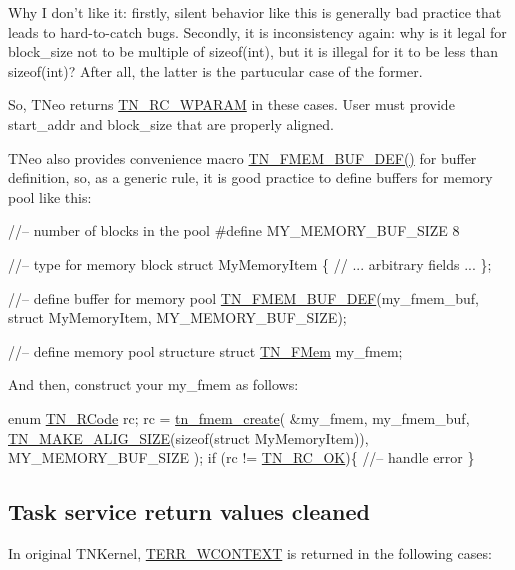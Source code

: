 Why I don't like it\+: firstly, silent behavior like this is generally bad practice that leads to hard-\/to-\/catch bugs. Secondly, it is inconsistency again\+: why is it legal for {\ttfamily block\+\_\+size} not to be multiple of {\ttfamily sizeof(int)}, but it is illegal for it to be less than {\ttfamily sizeof(int)}? After all, the latter is the partucular case of the former.

So, T\+Neo returns {\ttfamily \hyperlink{tn__common_8h_aa43bd3da1ad4c1e61224b5f23b369876a89909a6426b477a38496a1be67590e68}{T\+N\+\_\+\+R\+C\+\_\+\+W\+P\+A\+R\+A\+M}} in these cases. User must provide {\ttfamily start\+\_\+addr} and {\ttfamily block\+\_\+size} that are properly aligned.

T\+Neo also provides convenience macro {\ttfamily \hyperlink{tn__fmem_8h_ab45e9c2ad4a64345214f9a912bf76fc3}{T\+N\+\_\+\+F\+M\+E\+M\+\_\+\+B\+U\+F\+\_\+\+D\+E\+F()}} for buffer definition, so, as a generic rule, it is good practice to define buffers for memory pool like this\+:


\begin{DoxyCode}
\textcolor{comment}{//-- number of blocks in the pool}
\textcolor{preprocessor}{#define MY\_MEMORY\_BUF\_SIZE    8}

\textcolor{comment}{//-- type for memory block}
\textcolor{keyword}{struct }MyMemoryItem \{
   \textcolor{comment}{// ... arbitrary fields ...}
\};

\textcolor{comment}{//-- define buffer for memory pool}
\hyperlink{tn__fmem_8h_ab45e9c2ad4a64345214f9a912bf76fc3}{TN\_FMEM\_BUF\_DEF}(my\_fmem\_buf, \textcolor{keyword}{struct} MyMemoryItem, MY\_MEMORY\_BUF\_SIZE);

\textcolor{comment}{//-- define memory pool structure}
\textcolor{keyword}{struct }\hyperlink{structTN__FMem}{TN\_FMem} my\_fmem;
\end{DoxyCode}


And then, construct your {\ttfamily my\+\_\+fmem} as follows\+:


\begin{DoxyCode}
\textcolor{keyword}{enum} \hyperlink{tn__common_8h_aa43bd3da1ad4c1e61224b5f23b369876}{TN\_RCode} rc;
rc = \hyperlink{tn__fmem_8h_a56d47d4a1b6453d959336448a0ce96ac}{tn\_fmem\_create}( &my\_fmem,
                     my\_fmem\_buf,
                     \hyperlink{tn__common_8h_a3f48380e8a624edc643319a81192d88e}{TN\_MAKE\_ALIG\_SIZE}(\textcolor{keyword}{sizeof}(\textcolor{keyword}{struct} MyMemoryItem)),
                     MY\_MEMORY\_BUF\_SIZE );
\textcolor{keywordflow}{if} (rc != \hyperlink{tn__common_8h_aa43bd3da1ad4c1e61224b5f23b369876afb291924237186f5765865256c75e639}{TN\_RC\_OK})\{
   \textcolor{comment}{//-- handle error}
\}
\end{DoxyCode}
\hypertarget{tnkernel_diff_tnkernel_diff_task_retval}{}\subsection{Task service return values cleaned}\label{tnkernel_diff_tnkernel_diff_task_retval}
In original T\+N\+Kernel, {\ttfamily \hyperlink{tn__oldsymbols_8h_ad591ae7c53bbb81247492ea1d34a70b6}{T\+E\+R\+R\+\_\+\+W\+C\+O\+N\+T\+E\+X\+T}} is returned in the following cases\+:


